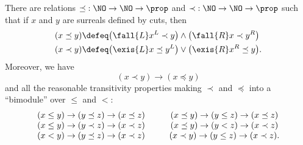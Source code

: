 \begin{thm}\label{defn:No-codes}
  There are relations $\mathord\preceq:\NO\to\NO\to\prop$ and $\mathord\prec:\NO\to\NO\to\prop$ such that if $x$ and $y$ are surreals defined by cuts, then
  \begin{align*}
    (x\preceq y) &\defeq
    \big(\fall{L} x^L\prec y\big) \land \big(\fall{R} x\prec y^R\big)\\
    (x\prec y) &\defeq
    \big(\exis{L} x\preceq y^L\big) \lor \big(\exis{R} x^R \preceq y\big).
  \end{align*}
  Moreover, we have
  \begin{equation}\label{eq:NO-codes-unstrict}
    (x\prec y) \to (x\preceq y)
  \end{equation}
  and all the reasonable transitivity properties making $\prec$ and $\preceq$ into a ``bimodule'' over $\le$ and $<$:
  \begin{equation}\label{eq:NO-codes-transitivity}
    \begin{array}{c@{\hspace{1cm}}c}
      (x \le y) \to (y\preceq z) \to (x\preceq z) &
      (x \preceq y) \to (y\le z) \to (x\preceq z) \\
      (x \le y) \to (y\prec z) \to (x\prec z) &
      (x \preceq y) \to (y< z) \to (x\prec z) \\
      (x < y) \to (y\preceq z) \to (x\prec z) &
      (x \prec y) \to (y\le z) \to (x\prec z).
  \end{array}
  \end{equation}
\end{thm}

